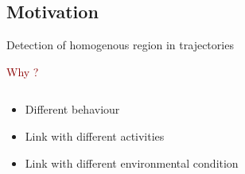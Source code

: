 \documentclass{beamer}\usepackage[]{graphicx}\usepackage[]{color}
\newcommand{\emphase}[1]{\textcolor{darkred}{#1}}
\newcommand{\paragraph}[1]{\emphase{#1}}
\begin{document}
\subsection*{Motivation}
\begin{frame}[fragile]{Detection of homogenous region in trajectories}

  \paragraph{Why ?}
\begin{columns}
\begin{column}{0.4\textwidth}
\begin{itemize}
\item Different behaviour
\item Link with different activities
\item Link with different environmental condition
\end{itemize}

\end{column}
\begin{column}{0.6\textwidth}



  
\end{column}
\end{columns}
\end{frame}
\end{document}

